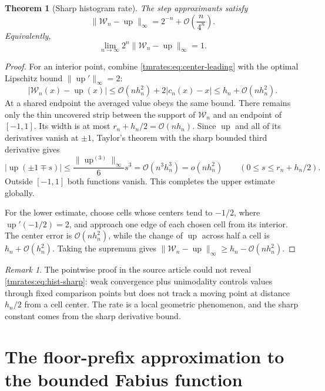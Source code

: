 \documentclass[11pt,oneside]{article}
\newtheorem{theorem}{Theorem}[section]
\theoremstyle{definition}
\theoremstyle{remark}
\newtheorem{remark}[remark]{Remark}
\newcommand{\Up}{\operatorname{up}}
\newcommand{\bigO}{\mathcal O}
\newcommand{\smallo}{o}
\begin{document}
\begin{theorem}[Sharp histogram rate]
\label{tmrates:thm:hist-sharp}
The step approximants satisfy
\begin{equation}
 \|\mathcal W_n-\Up\|_\infty
 =2^{-n}+\bigO\!\left(\frac n{4^n}\right).                \label{tmrates:eq:hist-sharp}
\end{equation}
Equivalently,
\begin{equation}
 \lim_{n\to\infty}2^n\|\mathcal W_n-\Up\|_\infty=1.      \label{tmrates:eq:hist-limit-constant}
\end{equation}
\end{theorem}

\begin{proof}
For an interior point, combine \eqref{tmrates:eq:center-leading} with the optimal Lipschitz bound
$\|\Up'\|_\infty=2$:
\[
 |\mathcal W_n(x)-\Up(x)|
 \le \bigO(nh_n^2)+2|c_n(x)-x|
 \le h_n+\bigO(nh_n^2).
\]
At a shared endpoint the averaged value obeys the same bound.  There remains only the thin
uncovered strip between the support of $\mathcal W_n$ and an endpoint of $[-1,1]$.
Its width is at most $r_n+h_n/2=\bigO(nh_n)$.  Since $\Up$ and all of its
derivatives vanish at $\pm1$, Taylor's theorem with the sharp bounded third derivative gives
\[
 |\Up(\pm1\mp s)|\le \frac{\|\Up^{(3)}\|_\infty}{6}s^3
 =\bigO(n^3h_n^3)=\smallo(nh_n^2)
 \qquad(0\le s\le r_n+h_n/2).
\]
Outside $[-1,1]$ both functions vanish.  This completes the upper estimate globally.

For the lower estimate, choose cells whose centers tend to $-1/2$, where
$\Up'(-1/2)=2$, and approach one edge of each chosen cell from its interior.  The center error
is $\bigO(nh_n^2)$, while the change of $\Up$ across half a cell is
$h_n+\bigO(h_n^2)$.  Taking the supremum gives
$\|\mathcal W_n-\Up\|_\infty\ge h_n-\bigO(nh_n^2)$.
\end{proof}

\begin{remark}
The pointwise proof in the source article could not reveal \eqref{tmrates:eq:hist-sharp}: weak
convergence plus unimodality controls values through fixed comparison points but does not
track a moving point at distance $h_n/2$ from a cell center.  The rate is a local geometric
phenomenon, and the sharp constant comes from the sharp derivative bound.
\end{remark}

\section{The floor-prefix approximation to the bounded Fabius function}
\label{tmrates:sec:floor-rate}
\end{document}
